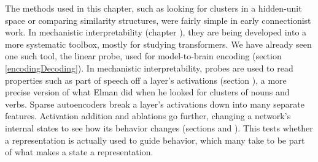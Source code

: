The methods used in this chapter, such as looking for clusters in a hidden-unit space or comparing similarity structures, were fairly simple in early connectionist work. In mechanistic interpretability (chapter ), they are being developed into a more systematic toolbox, mostly for studying transformers. We have already seen one such tool, the linear probe, used for model-to-brain encoding (section \ref{encodingDecoding}). In mechanistic interpretability, probes are used to read properties such as part of speech off a layer's activations (section ), a more precise version of what Elman did when he looked for clusters of nouns and verbs. Sparse autoencoders break a layer's activations down into many separate features. Activation addition and ablations go further, changing a network's internal states to see how its behavior changes (sections  and ). This tests whether a representation is actually used to guide behavior, which many take to be part of what makes a state a representation.




